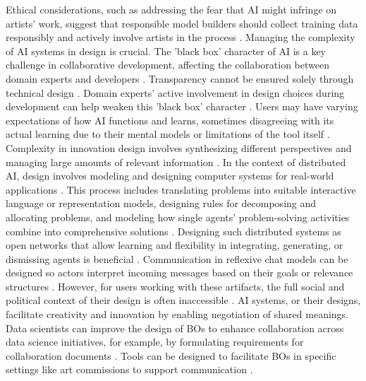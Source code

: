 \documentclass[12pt,oneside]{article}
\begin{document}
Ethical considerations, such as addressing the fear that \ac{AI} might infringe on artists' work, suggest that responsible model builders should collect training data responsibly and actively involve artists in the process \citep[15]{chung2023artinter}. Managing the complexity of \ac{AI} systems in design is crucial. The 'black box' character of \ac{AI} is a key challenge in collaborative development, affecting the collaboration between domain experts and developers \citep[6144-6145]{mayer2023managing}. Transparency cannot be ensured solely through technical design \citep[6145]{mayer2023managing}. Domain experts' active involvement in design choices during development can help weaken this 'black box' character \citep[6146]{mayer2023managing}. Users may have varying expectations of how \ac{AI} functions and learns, sometimes disagreeing with its actual learning due to their mental models or limitations of the tool itself \citep[14]{chung2023artinter}. \newline
Complexity in innovation design involves synthesizing different perspectives and managing large amounts of relevant information \citep[13]{koskinen2005metaphoric}. In the context of distributed \ac{AI}, design involves modeling and designing computer systems for real-world applications \citep[441]{strübing1998bridging}. This process includes translating problems into suitable interactive language or representation models, designing rules for decomposing and allocating problems, and modeling how single agents' problem-solving activities combine into comprehensive solutions \citep[444]{strübing1998bridging}. Designing such distributed systems as open networks that allow learning and flexibility in integrating, generating, or dismissing agents is beneficial \citep[444]{strübing1998bridging}. Communication in reflexive chat models can be designed so actors interpret incoming messages based on their goals or relevance structures \citep[452]{strübing1998bridging}. 
However, for users working with these artifacts, the full social and political context of their design is often inaccessible \citep[452]{strübing1998bridging}.  \ac{AI} systems, or their designs, facilitate creativity and innovation by enabling negotiation of shared meanings. Data scientists can improve the design of \ac{BO}s to enhance collaboration across data science initiatives, for example, by formulating requirements for collaboration documents \citep[12]{rahlmeier2024bridging}. Tools can be designed to facilitate \ac{BO}s in specific settings like art commissions to support communication \citep[3]{chung2023artinter}.
\end{document}
